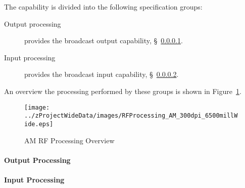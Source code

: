The \ThisSys \ThisSegment capability is divided into the following specification groups:
\begin{description}
	\item[Output processing] provides the \AM broadcast output capability, \S~\ref{loc:RF_AM_Output}.
	\item[Input processing]  provides the \AM broadcast input  capability, \S~\ref{loc:RF_AM_Input}.
\end{description}
An overview the processing performed by these groups is shown in Figure~\ref{fig:AM_RF_Processing}.
\begin{figure}[htbp]
	\centering
		\texttt{[image: ../zProjectWideData/images/RFProcessing\_AM\_300dpi\_6500millWide.eps]}
	\caption[AM RF Processing Overview]{AM RF Processing Overview}
	\label{fig:AM_RF_Processing}
\end{figure}

\KNEADPARAGRAPHNEWPAGE
\paragraph{\AM \RF Output Processing}
\label{loc:RF_AM_Output}
\renewcommand{\ThisSubSegment}{\AM \RF Output Processing\xspace}%


\KNEADPARAGRAPHNEWPAGE
\paragraph{\AM \RF Input Processing}
\label{loc:RF_AM_Input}
\renewcommand{\ThisSubSegment}{\AM \RF Input Processing\xspace}%

